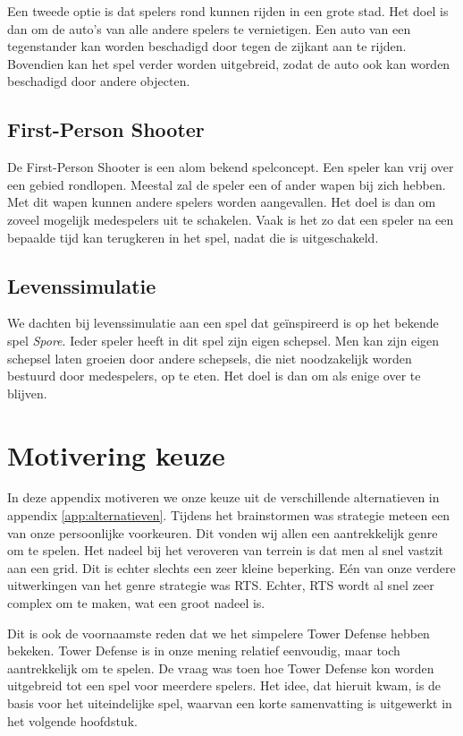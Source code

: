     Een tweede optie is dat spelers rond kunnen rijden in een grote stad. Het doel is dan om de auto's van alle andere spelers te vernietigen. Een auto van een tegenstander kan worden beschadigd door tegen de zijkant aan te rijden. Bovendien kan het spel verder worden uitgebreid, zodat de auto ook kan worden beschadigd door andere objecten.

    \subsection{First-Person Shooter}
    De First-Person Shooter is een alom bekend spelconcept. Een speler kan vrij over een gebied rondlopen. Meestal zal de speler een of ander wapen bij zich hebben. Met dit wapen kunnen andere spelers worden aangevallen. Het doel is dan om zoveel mogelijk medespelers uit te schakelen. Vaak is het zo dat een speler na een bepaalde tijd kan terugkeren in het spel, nadat die is uitgeschakeld.

    \subsection{Levenssimulatie}
    We dachten bij levenssimulatie aan een spel dat ge\"inspireerd is op het bekende spel \emph{Spore}. Ieder speler heeft in dit spel zijn eigen schepsel. Men kan zijn eigen schepsel laten groeien door andere schepsels, die niet noodzakelijk worden bestuurd door medespelers, op te eten. Het doel is dan om als enige over te blijven.

    \newpage
    \section{Motivering keuze}
    \label{app:motivering}
    In deze appendix motiveren we onze keuze uit de verschillende alternatieven in appendix \ref{app:alternatieven}. Tijdens het brainstormen was strategie meteen een van onze persoonlijke voorkeuren. Dit vonden wij allen een aantrekkelijk genre om te spelen. Het nadeel bij het veroveren van terrein is dat men al snel vastzit aan een grid. Dit is echter slechts een zeer kleine beperking. E\'en van onze verdere uitwerkingen van het genre strategie was RTS. Echter, RTS wordt al snel zeer complex om te maken, wat een groot nadeel is.

    Dit is ook de voornaamste reden dat we het simpelere Tower Defense hebben bekeken. Tower Defense is in onze mening relatief eenvoudig, maar toch aantrekkelijk om te spelen. De vraag was toen hoe Tower Defense kon worden uitgebreid tot een spel voor meerdere spelers. Het idee, dat hieruit kwam, is de basis voor het uiteindelijke spel, waarvan een korte samenvatting is uitgewerkt in het volgende hoofdstuk.

